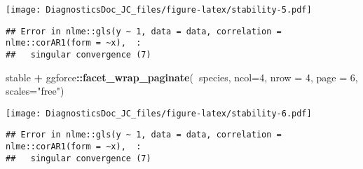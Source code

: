 \documentclass[
]{article}
\newenvironment{Shaded}{\begin{snugshade}}{\end{snugshade}}
\newcommand{\DataTypeTok}[1]{\textcolor[rgb]{0.13,0.29,0.53}{#1}}
\newcommand{\DecValTok}[1]{\textcolor[rgb]{0.00,0.00,0.81}{#1}}
\newcommand{\KeywordTok}[1]{\textcolor[rgb]{0.13,0.29,0.53}{\textbf{#1}}}
\newcommand{\NormalTok}[1]{#1}
\newcommand{\OperatorTok}[1]{\textcolor[rgb]{0.81,0.36,0.00}{\textbf{#1}}}
\newcommand{\StringTok}[1]{\textcolor[rgb]{0.31,0.60,0.02}{#1}}
\begin{document}
\texttt{[image: DiagnosticsDoc\_JC\_files/figure-latex/stability-5.pdf]}

\begin{verbatim}
## Error in nlme::gls(y ~ 1, data = data, correlation = nlme::corAR1(form = ~x),  : 
##   singular convergence (7)
\end{verbatim}

\begin{Shaded}
\begin{Highlighting}[]
\NormalTok{stable }\OperatorTok{+}\StringTok{ }\NormalTok{ggforce}\OperatorTok{::}\KeywordTok{facet_wrap_paginate}\NormalTok{(}\OperatorTok{~}\NormalTok{species, }\DataTypeTok{ncol=}\DecValTok{4}\NormalTok{, }\DataTypeTok{nrow =} \DecValTok{4}\NormalTok{, }\DataTypeTok{page =} \DecValTok{6}\NormalTok{, }\DataTypeTok{scales=}\StringTok{"free"}\NormalTok{)}
\end{Highlighting}
\end{Shaded}

\texttt{[image: DiagnosticsDoc\_JC\_files/figure-latex/stability-6.pdf]}

\begin{verbatim}
## Error in nlme::gls(y ~ 1, data = data, correlation = nlme::corAR1(form = ~x),  : 
##   singular convergence (7)
\end{verbatim}
\end{document}
